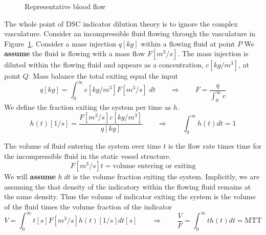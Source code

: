 \documentclass[12pt]{article}
\newcommand{\picdir}{pdffig}
\begin{document}
\begin{figure}[h]
\centering
{}
\caption{Representative blood flow
} \label{fig:DSCbloodflow}
\end{figure}

The whole point of DSC indicator dilution theory is to ignore the complex
vasculature. Consider an incompressible fluid flowing through the vasculature in Figure~\ref{fig:DSCbloodflow}.
Consider a mass injection $q [kg]$ within a flowing fluid at point $P$ 
We \textbf{assume} the fluid is flowing with a mass flow $F[m^3/s]$. 
The mass injection is diluted within the flowing fluid and appears as a
concentration, $c[kg/m^3]$,  at point $Q$.
Mass balance the total exiting equal the input
\[
    q [kg] = \int_0^\infty c[kg/m^3]F[m^3/s] \;dt  \qquad \Rightarrow  \qquad F = \frac{q }{\int_0^\infty c}
\]
We define the fraction exiting the system per time as $h$.
\[
      h(t)[1/s] = \frac{F [m^3/s] c [kg/m^3]}{q[kg]} \qquad \Rightarrow \qquad \int_0^\infty h(t) dt = 1
\]

The volume of fluid entering the system over time $t$ is the flow rate times
time for the incompressible fluid in the static vessel structure.
\[
  F[m^3/s] t = \text{volume entering or exiting}
\]
We  will \textbf{assume} $h \; dt$ is the volume fraction exiting the system.
Implicitly, we are assuming the that density of the indicatory within the
flowing fluid remains at the same density. 
Thus the volume of indicator exiting the system is the volume of the fluid times
the volume fraction of the indicator
\[
   V = \int_0^\infty t [s] F[m^3/s] h(t) [1/s] dt [s]
\qquad \Rightarrow \qquad
   \frac{V}{F} = \int_0^\infty t  h(t)  dt  = \text{MTT}
\]
\end{document}
